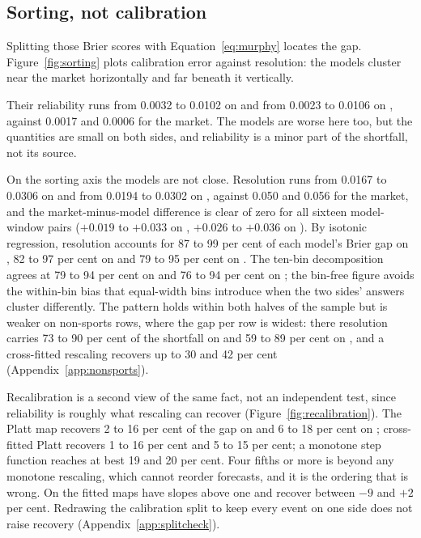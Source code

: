 \subsection{Sorting, not calibration}
\label{sec:results-sorting}

Splitting those Brier scores with Equation~\eqref{eq:murphy} locates the gap.
Figure~\ref{fig:sorting} plots calibration error against resolution: the models
cluster near the market horizontally and far beneath it vertically.

Their reliability runs from 0.0032 to 0.0102 on \winB and from 0.0023 to 0.0106
on \winC, against 0.0017 and 0.0006 for the market. The models are worse here
too, but the quantities are small on both sides, and reliability is a minor part
of the shortfall, not its source.

On the sorting axis the models are not close. Resolution runs from 0.0167 to
0.0306 on \winB and from 0.0194 to 0.0302 on \winC, against 0.050 and 0.056 for
the market, and the market-minus-model
difference is clear of zero for all sixteen model-window pairs ($+0.019$ to
$+0.033$ on \winB, $+0.026$ to $+0.036$ on \winC). By isotonic regression,
resolution accounts for 87 to 99 per cent of each model's Brier gap on \winA, 82
to 97 per cent on \winB and 79 to 95 per cent on \winC. The ten-bin decomposition agrees at 79 to 94 per cent on
\winB and 76 to 94 per cent on \winC; the bin-free figure avoids the within-bin
bias that equal-width bins introduce when the two sides' answers cluster
differently. The pattern holds within both halves of the sample but is weaker on
non-sports rows, where the gap per row is widest: there resolution carries 73 to
90 per cent of the shortfall on \winB and 59 to 89 per cent on \winC, and a
cross-fitted rescaling recovers up to 30 and 42 per cent
(Appendix~\ref{app:nonsports}).

Recalibration is a second view of the same fact, not an independent test, since
reliability is roughly what rescaling can recover (Figure~\ref{fig:recalibration}). The Platt
map recovers 2 to 16 per cent of the gap on \winB and 6 to 18 per cent on \winC;
cross-fitted Platt recovers 1 to 16 per cent and 5 to 15 per cent; a monotone
step function reaches at best 19 and 20 per cent. Four fifths or more is beyond
any monotone rescaling, which cannot reorder forecasts, and it is the ordering
that is wrong. On \winA the fitted maps have slopes above one and recover between
$-9$ and $+2$ per cent. Redrawing the calibration split to keep every event on
one side does not raise recovery (Appendix~\ref{app:splitcheck}).


